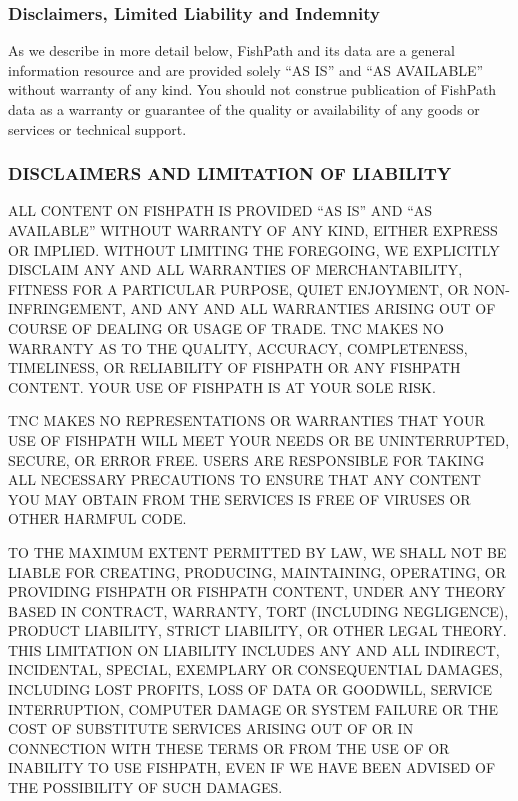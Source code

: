 \documentclass[
  11pt,
]{book}
\begin{document}
\hypertarget{disclaimers-limited-liability-and-indemnity}{%
\subsubsection*{Disclaimers, Limited Liability and Indemnity}\label{disclaimers-limited-liability-and-indemnity}}

As we describe in more detail below, FishPath and its data are a general information resource and are provided solely ``AS IS'' and ``AS AVAILABLE'' without warranty of any kind. You should not construe publication of FishPath data as a warranty or guarantee of the quality or availability of any goods or services or technical support.

\hypertarget{disclaimers-and-limitation-of-liability}{%
\subsubsection*{DISCLAIMERS AND LIMITATION OF LIABILITY}\label{disclaimers-and-limitation-of-liability}}

ALL CONTENT ON FISHPATH IS PROVIDED ``AS IS'' AND ``AS AVAILABLE'' WITHOUT WARRANTY OF ANY KIND, EITHER EXPRESS OR IMPLIED. WITHOUT LIMITING THE FOREGOING, WE EXPLICITLY DISCLAIM ANY AND ALL WARRANTIES OF MERCHANTABILITY, FITNESS FOR A PARTICULAR PURPOSE, QUIET ENJOYMENT, OR NON-INFRINGEMENT, AND ANY AND ALL WARRANTIES ARISING OUT OF COURSE OF DEALING OR USAGE OF TRADE. TNC MAKES NO WARRANTY AS TO THE QUALITY, ACCURACY, COMPLETENESS, TIMELINESS, OR RELIABILITY OF FISHPATH OR ANY FISHPATH CONTENT. YOUR USE OF FISHPATH IS AT YOUR SOLE RISK.

TNC MAKES NO REPRESENTATIONS OR WARRANTIES THAT YOUR USE OF FISHPATH WILL MEET YOUR NEEDS OR BE UNINTERRUPTED, SECURE, OR ERROR FREE. USERS ARE RESPONSIBLE FOR TAKING ALL NECESSARY PRECAUTIONS TO ENSURE THAT ANY CONTENT YOU MAY OBTAIN FROM THE SERVICES IS FREE OF VIRUSES OR OTHER HARMFUL CODE.

TO THE MAXIMUM EXTENT PERMITTED BY LAW, WE SHALL NOT BE LIABLE FOR CREATING, PRODUCING, MAINTAINING, OPERATING, OR PROVIDING FISHPATH OR FISHPATH CONTENT, UNDER ANY THEORY BASED IN CONTRACT, WARRANTY, TORT (INCLUDING NEGLIGENCE), PRODUCT LIABILITY, STRICT LIABILITY, OR OTHER LEGAL THEORY. THIS LIMITATION ON LIABILITY INCLUDES ANY AND ALL INDIRECT, INCIDENTAL, SPECIAL, EXEMPLARY OR CONSEQUENTIAL DAMAGES, INCLUDING LOST PROFITS, LOSS OF DATA OR GOODWILL, SERVICE INTERRUPTION, COMPUTER DAMAGE OR SYSTEM FAILURE OR THE COST OF SUBSTITUTE SERVICES ARISING OUT OF OR IN CONNECTION WITH THESE TERMS OR FROM THE USE OF OR INABILITY TO USE FISHPATH, EVEN IF WE HAVE BEEN ADVISED OF THE POSSIBILITY OF SUCH DAMAGES.
\end{document}
